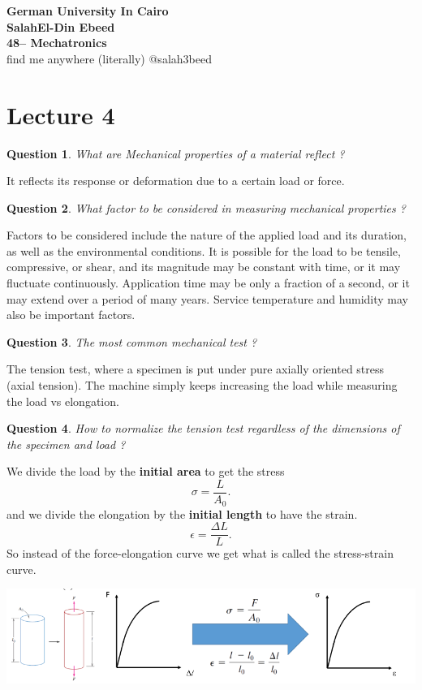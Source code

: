\documentclass[13]{article}
\newtheorem{exer}{Question}
\begin{document}
\begin{center}
{\LARGE \textbf{German University In Cairo
	\\ SalahEl-Din Ebeed 
	\\ 48-- Mechatronics 
}}
\\ find me anywhere (literally) @salah3beed
\end{center}


\section{Lecture 4}
\begin{exer}
What are Mechanical properties of a material reflect ?
\end{exer}

It reflects its response or deformation due to a certain load or force.
\begin{exer}
What factor to be considered in measuring mechanical properties ?
\end{exer}
Factors to be considered include the nature of the applied load and its
duration, as well as the environmental conditions. It is possible for the
load to be tensile, compressive, or shear, and its magnitude may be constant
with time, or it may fluctuate continuously.  Application time may be only a
fraction of a second, or it may extend over a period of many years. Service
temperature and humidity may also be important factors.
\begin{exer}
The most common mechanical test  ?
\end{exer}
The tension test, where a specimen is put under pure axially oriented stress (axial tension). The machine simply keeps increasing the load while measuring the load vs elongation. 
\begin{exer}
How to normalize the tension test regardless of the dimensions of the specimen and load ?
\end{exer}
We divide the load by the \textbf{initial area}  to get the stress
\[
\sigma = \frac{L}{A_0} 
.\] 
and we divide the elongation by the \textbf{initial length }to have the strain. 
\[
\epsilon = \frac{\Delta L}{L} 
.\] 
So instead of the force-elongation curve we get what is called the stress-strain curve.
\\
\begin{center}
\includegraphics[scale=0.5]{figures/1.png}
\end{center}
\end{document}
